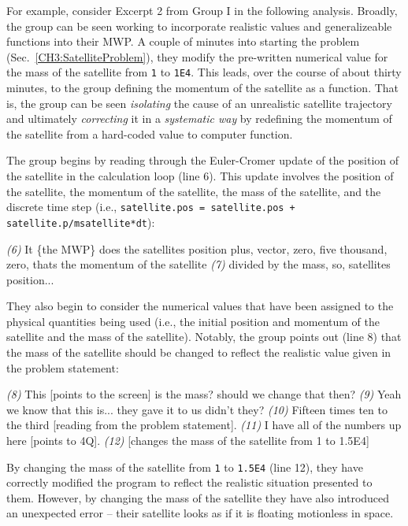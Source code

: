 \documentclass{msuphddissertation}
\begin{document}
\begin{doublespace}
For example, consider Excerpt 2 from Group I in the following analysis.  Broadly, the group can be seen working to incorporate realistic values and generalizeable functions into their MWP.  A couple of minutes into starting the problem (Sec.~\ref{CH3:SatelliteProblem}), they modify the pre-written numerical value for the mass of the satellite from \texttt{1} to \texttt{1E4}.  This leads, over the course of about thirty minutes, to the group defining the momentum of the satellite as a function.  That is, the group can be seen \textit{isolating} the cause of an unrealistic satellite trajectory and ultimately \textit{correcting} it in a \textit{systematic way} by redefining the momentum of the satellite from a hard-coded value to computer function.

The group begins by reading through the Euler-Cromer update of the position of the satellite in the calculation loop (line 6).  This update involves the position of the satellite, the momentum of the satellite, the mass of the satellite, and the discrete time step (i.e., \texttt{satellite.pos = satellite.pos + satellite.p/msatellite*dt}):  \begin{description}
\SC \textit{(6)} It \{the MWP\} does the satellites position plus, vector, zero, five thousand, zero, thats the momentum of the satellite
\SC \textit{(7)} divided by the mass, so, satellites position...\end{description}  They also begin to consider the numerical values that have been assigned to the physical quantities being used (i.e., the initial position and momentum of the satellite and the mass of the satellite).  Notably, the group points out (line 8) that the mass of the satellite should be changed to reflect the realistic value given in the problem statement: \begin{description}
\SD \textit{(8)} This [points to the screen] is the mass? should we change that then?
\SC \textit{(9)} Yeah we know that this is... they gave it to us didn't they?
\SD \textit{(10)} Fifteen times ten to the third [reading from the problem statement].
\SA \textit{(11)} I have all of the numbers up here [points to 4Q].
\SC \textit{(12)} [changes the mass of the satellite from 1 to 1.5E4]
\end{description}  By changing the mass of the satellite from \texttt{1} to \texttt{1.5E4} (line 12), they have correctly modified the program to reflect the realistic situation presented to them.  However, by changing the mass of the satellite they have also introduced an unexpected error -- their satellite looks as if it is floating motionless in space.


\end{doublespace}
\end{document}
